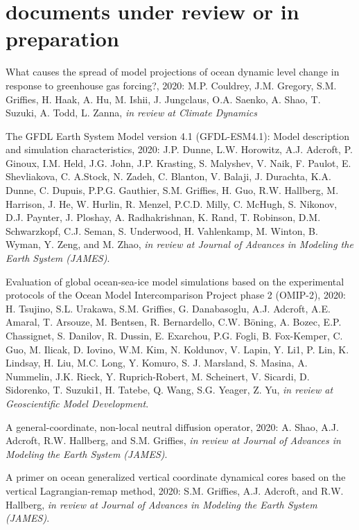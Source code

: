 \section*{\sc \color{Maroon} documents under review or in preparation}

\small 


\begin{etaremune}

\item What causes the spread of model projections of ocean dynamic level change in response to greenhouse gas forcing?, 2020: M.P. Couldrey, J.M. Gregory, S.M. Griffies, H. Haak, A. Hu, M. Ishii, J. Jungclaus, O.A. Saenko, A. Shao, T. Suzuki, A. Todd, L. Zanna, {\it in review at Climate Dynamics}

\item The GFDL Earth System Model version 4.1 (GFDL-ESM4.1): Model description and simulation characteristics, 2020: J.P. Dunne, L.W. Horowitz, A.J. Adcroft, P. Ginoux, I.M. Held, J.G. John, J.P. Krasting, S. Malyshev, V. Naik, F. Paulot, E. Shevliakova, C. A.Stock, N. Zadeh, C. Blanton, V. Balaji, J. Durachta, K.A. Dunne, C. Dupuis, P.P.G. Gauthier, S.M. Griffies, H. Guo, R.W. Hallberg, M. Harrison, J. He, W. Hurlin, R. Menzel, P.C.D. Milly, C. McHugh, S. Nikonov, D.J. Paynter, J. Ploshay, A. Radhakrishnan, K. Rand, T. Robinson, D.M. Schwarzkopf, C.J. Seman, S. Underwood, H. Vahlenkamp, M. Winton, B. Wyman, Y. Zeng, and M. Zhao, {\it in review at Journal of Advances in Modeling the Earth System (JAMES)}.

\item Evaluation of global ocean-sea-ice model simulations based on the experimental protocols of the Ocean Model Intercomparison Project phase 2 (OMIP-2), 2020: H. Tsujino, S.L. Urakawa, S.M. Griffies, G. Danabasoglu, A.J. Adcroft, A.E. Amaral, T. Arsouze, M. Bentsen, R. Bernardello, C.W. {B\"{o}ning}, A. Bozec, E.P. Chassignet, S. Danilov, R. Dussin, E. Exarchou, P.G. Fogli, B. Fox-Kemper, C. Guo, M. Ilicak, D. Iovino, W.M. Kim, N. Koldunov, V. Lapin, Y. Li1, P. Lin, K. Lindsay, H. Liu, M.C. Long, Y. Komuro, S. J. Marsland, S. Masina, A. Nummelin, J.K. Rieck, Y. Ruprich-Robert, M. Scheinert, V. Sicardi, D. Sidorenko, T. Suzuki1, H. Tatebe, Q. Wang, S.G. Yeager, Z. Yu, {\it in review at Geoscientific Model Development}.

\item A general-coordinate, non-local neutral diffusion operator, 2020: A. Shao, A.J. Adcroft, R.W. Hallberg, and S.M. Grif\/f\/ies, {\it in review at Journal of Advances in Modeling the Earth System (JAMES)}.

\item A primer on ocean generalized vertical coordinate dynamical cores based on the vertical Lagrangian-remap method, 2020: S.M. Grif\/f\/ies, A.J. Adcroft, and R.W. Hallberg, {\it in review at Journal of Advances in Modeling the Earth System (JAMES)}.


\end{etaremune}


